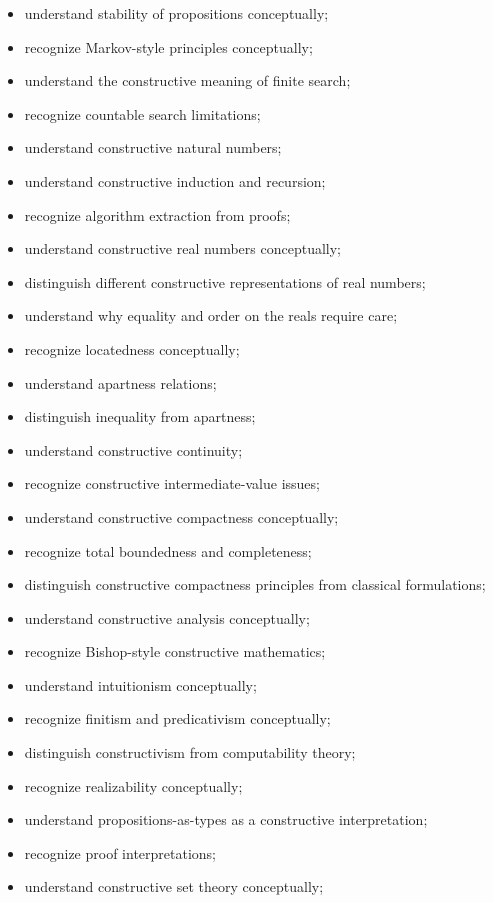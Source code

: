 {\begin{itemize}
    \item understand stability of propositions conceptually;
    \item recognize Markov-style principles conceptually;
    \item understand the constructive meaning of finite search;
    \item recognize countable search limitations;
    \item understand constructive natural numbers;
    \item understand constructive induction and recursion;
    \item recognize algorithm extraction from proofs;
    \item understand constructive real numbers conceptually;
    \item distinguish different constructive representations of real numbers;
    \item understand why equality and order on the reals require care;
    \item recognize locatedness conceptually;
    \item understand apartness relations;
    \item distinguish inequality from apartness;
    \item understand constructive continuity;
    \item recognize constructive intermediate-value issues;
    \item understand constructive compactness conceptually;
    \item recognize total boundedness and completeness;
    \item distinguish constructive compactness principles from classical
          formulations;
    \item understand constructive analysis conceptually;
    \item recognize Bishop-style constructive mathematics;
    \item understand intuitionism conceptually;
    \item recognize finitism and predicativism conceptually;
    \item distinguish constructivism from computability theory;
    \item recognize realizability conceptually;
    \item understand propositions-as-types as a constructive interpretation;
    \item recognize proof interpretations;
    \item understand constructive set theory conceptually;

\end{itemize}}
